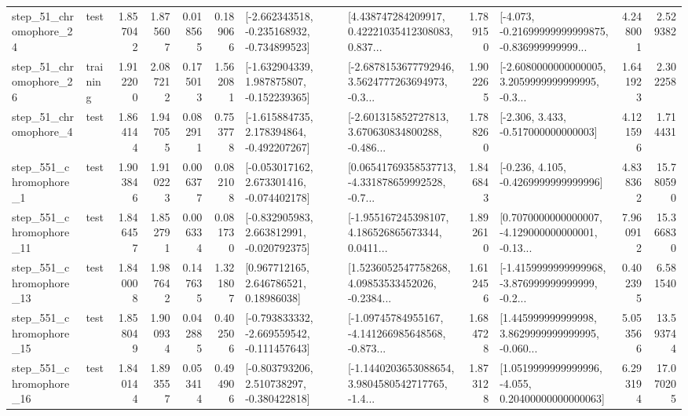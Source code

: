 \begin{tabular}{llrrrrllrlrr}
   step\_51\_chromophore\_24 &      test &      1.857042 &    1.875607 &      0.018565 &  0.189066 &  [-2.662343518, -0.235168932, -0.734899523] &  [4.438747284209917, 0.42221035412308083, 0.837... &       1.789150 &  [-4.073, -0.21699999999999875, -0.836999999999... &            4.248001 &          2.529382 \\
   step\_51\_chromophore\_26 &  training &      1.912200 &    2.087212 &      0.175013 &  1.562081 &   [-1.632904339, 1.987875807, -0.152239365] &  [-2.6878153677792946, 3.5624777263694973, -0.3... &       1.902265 &  [-2.6080000000000005, 3.2059999999999995, -0.3... &            1.641923 &          2.302258 \\
    step\_51\_chromophore\_4 &      test &      1.864144 &    1.947055 &      0.082911 &  0.753778 &   [-1.615884735, 2.178394864, -0.492207267] &  [-2.601315852727813, 3.670630834800288, -0.486... &       1.788260 &                [-2.306, 3.433, -0.517000000000003] &            4.121596 &          1.714431 \\
   step\_551\_chromophore\_1 &      test &      1.903846 &    1.910223 &      0.006377 &  0.082108 &   [-0.053017162, 2.673301416, -0.074402178] &  [0.06541769358537713, -4.331878659992528, -0.7... &       1.846843 &               [-0.236, 4.105, -0.4269999999999996] &            4.838362 &         15.780590 \\
  step\_551\_chromophore\_11 &      test &      1.846457 &    1.852791 &      0.006334 &  0.081730 &   [-0.832905983, 2.663812991, -0.020792375] &  [-1.955167245398107, 4.186526865673344, 0.0411... &       1.892610 &  [0.7070000000000007, -4.129000000000001, -0.13... &            7.960912 &         15.366830 \\
  step\_551\_chromophore\_13 &      test &      1.840008 &    1.987642 &      0.147635 &  1.321807 &      [0.967712165, 2.646786521, 0.18986038] &  [1.5236052547758268, 4.09853533452026, -0.2384... &       1.612456 &  [-1.4159999999999968, -3.876999999999999, -0.2... &            0.402395 &          6.581540 \\
  step\_551\_chromophore\_15 &      test &      1.858049 &    1.900934 &      0.042885 &  0.402506 &  [-0.793833332, -2.669559542, -0.111457643] &  [-1.09745784955167, -4.141266985648568, -0.873... &       1.684728 &  [1.445999999999998, 3.8629999999999995, -0.060... &            5.053566 &         13.593744 \\
  step\_551\_chromophore\_16 &      test &      1.840144 &    1.893557 &      0.053414 &  0.494906 &   [-0.803793206, 2.510738297, -0.380422818] &  [-1.1440203653088654, 3.9804580542717765, -1.4... &       1.873128 &  [1.0519999999999996, -4.055, 0.20400000000000063] &            6.293194 &         17.070205 \\

\end{tabular}
